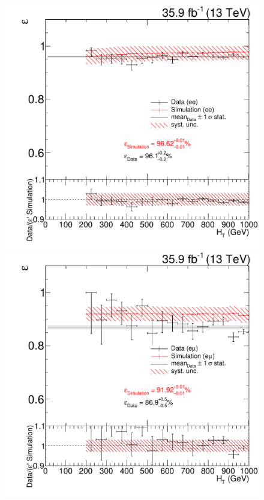 \begin{figure}[htb]
 \centering
 \includegraphics[width=\pairwidth]{figures/triggerStudies/efficiency_dataHT_trigDilep_ptcuts_EE_ht}
 \includegraphics[width=\pairwidth]{figures/triggerStudies/efficiency_dataHT_trigDilep_ptcuts_EM_ht}

\end{figure}
